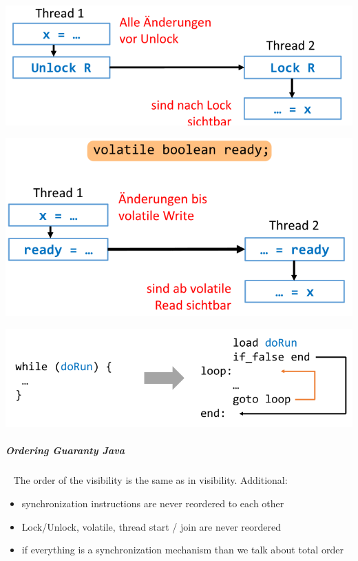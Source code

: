 \documentclass[11pt,twoside,landscape]{article}
\begin{document}
\begin{multicols}{3}
{{{
\begin{center}
\includegraphics[width=.9\linewidth]{img/visibility_lock_unlock.png}
\end{center}
\label{fig:visibility-lock-unlock}
}

{
\begin{center}
\includegraphics[width=.9\linewidth]{img/visibility_volatile_write_read.png}
\end{center}
\label{fig:visibility-volatile-write-read}
}


{
\begin{center}
\includegraphics[width=.9\linewidth]{img/visibility_problems.png}
\end{center}
\label{fig:visibility-problems}
}
\subparagraph{Ordering Guaranty Java} \
\label{sec:orgf464275}
The order of the visibility is the same as in visibility.
Additional:
\begin{itemize}
\item synchronization instructions are never reordered to each other
\item Lock/Unlock, volatile, thread start / join are never reordered
\item if everything is a synchronization mechanism than we talk about total order
\end{itemize}


}}
\end{multicols}
\end{document}
